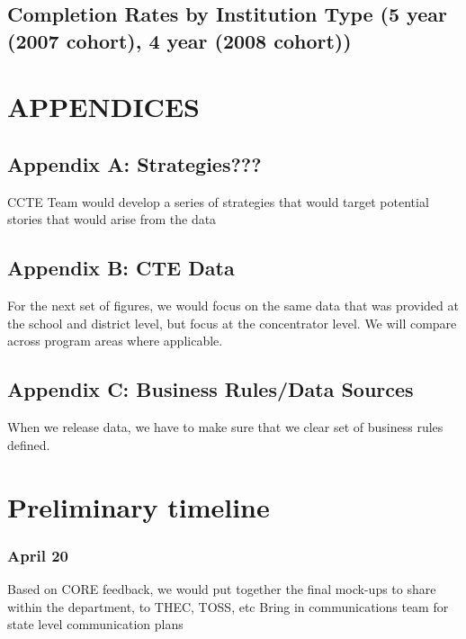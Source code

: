 \documentclass[11pt,]{article}
\begin{document}
\subsection{Completion Rates by Institution Type (5 year (2007 cohort),
4 year (2008
cohort))}\label{completion-rates-by-institution-type-5-year-2007-cohort-4-year-2008-cohort}

\newpage

\section{APPENDICES}\label{appendices}

\subsection{Appendix A: Strategies???}\label{appendix-a-strategies}

CCTE Team would develop a series of strategies that would target
potential stories that would arise from the data

\subsection{Appendix B: CTE Data}\label{appendix-b-cte-data}

For the next set of figures, we would focus on the same data that was
provided at the school and district level, but focus at the concentrator
level. We will compare across program areas where applicable.

\subsection{Appendix C: Business Rules/Data
Sources}\label{appendix-c-business-rulesdata-sources}

When we release data, we have to make sure that we clear set of business
rules defined.

\section{Preliminary timeline}\label{preliminary-timeline}

\subsubsection{April 20}\label{april-20}

Based on CORE feedback, we would put together the final mock-ups to
share within the department, to THEC, TOSS, etc Bring in communications
team for state level communication plans
\end{document}
